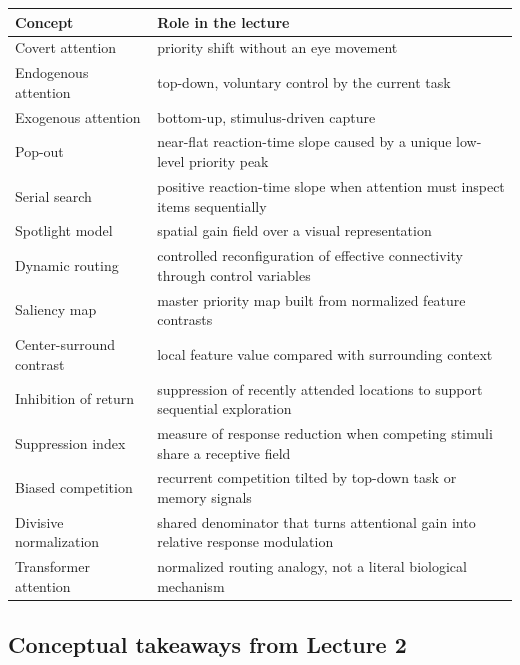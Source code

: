 \begin{center}
\begin{tabular}{lp{}}
\hline
Concept & Role in the lecture \\
\hline
Covert attention & priority shift without an eye movement \\
Endogenous attention & top-down, voluntary control by the current task \\
Exogenous attention & bottom-up, stimulus-driven capture \\
Pop-out & near-flat reaction-time slope caused by a unique low-level priority peak \\
Serial search & positive reaction-time slope when attention must inspect items sequentially \\
Spotlight model & spatial gain field over a visual representation \\
Dynamic routing & controlled reconfiguration of effective connectivity through control variables \\
Saliency map & master priority map built from normalized feature contrasts \\
Center-surround contrast & local feature value compared with surrounding context \\
Inhibition of return & suppression of recently attended locations to support sequential exploration \\
Suppression index & measure of response reduction when competing stimuli share a receptive field \\
Biased competition & recurrent competition tilted by top-down task or memory signals \\
Divisive normalization & shared denominator that turns attentional gain into relative response modulation \\
Transformer attention & normalized routing analogy, not a literal biological mechanism \\
\hline
\end{tabular}
\end{center}

\subsection{Conceptual takeaways from Lecture 2}

